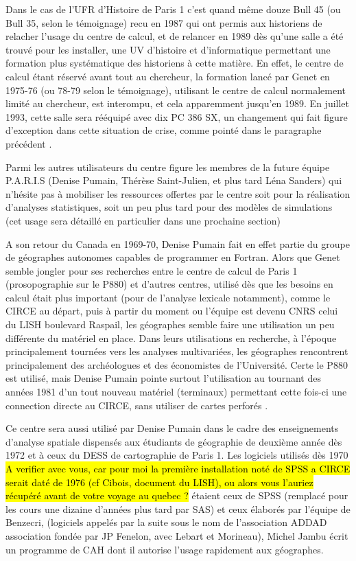 Dans le cas de l'UFR d'Histoire de Paris 1 c'est quand même douze Bull 45 (ou Bull 35, selon le témoignage) recu en 1987 qui ont permis aux historiens de relacher l'usage du centre de calcul, et de relancer en 1989 dès qu'une salle a été trouvé pour les installer, une UV d'histoire et d'informatique permettant une formation plus systématique des historiens à cette matière. En effet, le centre de calcul étant réservé avant tout au chercheur, la formation lancé par Genet en 1975-76 (ou 78-79 selon le témoignage), utilisant le centre de calcul normalement limité au chercheur, est interompu, et cela apparemment jusqu'en 1989. En juillet 1993, cette salle sera rééquipé avec dix PC 386 SX, un changement qui fait figure d'exception dans cette situation de crise, comme pointé dans le paragraphe précédent \autocite{Genet1993}. 

Parmi les autres utilisateurs du centre figure les membres de la future équipe P.A.R.I.S (Denise Pumain, Thérèse Saint-Julien, et plus tard Léna Sanders) qui n'hésite pas à mobiliser les ressources offertes par le centre soit pour la réalisation d'analyses statistiques, soit un peu plus tard pour des modèles de simulations (cet usage sera détaillé en particulier dans une prochaine section)

A son retour du Canada en 1969-70, Denise Pumain fait en effet partie du groupe de géographes autonomes capables de programmer en Fortran. Alors que Genet semble jongler pour ses recherches entre le centre de calcul de Paris 1 (prosopographie sur le P880) et d'autres centres, utilisé dès que les besoins en calcul était plus important (pour de l'analyse lexicale notamment), comme le CIRCE au départ, puis à partir du moment ou l'équipe est devenu CNRS celui du LISH boulevard Raspail, les géographes semble faire une utilisation un peu différente du matériel en place.  Dans leurs utilisations en recherche, à l'époque principalement tournées vers les analyses multivariées, les géographes rencontrent principalement des archéologues et des économistes de l'Université. Certe le P880 est utilisé, mais Denise Pumain pointe surtout l'utilisation au tournant des années 1981 d'un tout nouveau matériel (terminaux) permettant cette fois-ci une connection directe au CIRCE, sans utiliser de cartes perforés .

Ce centre sera aussi utilisé par Denise Pumain dans le cadre des enseignements d'analyse spatiale dispensés aux étudiants de géographie de deuxième année dès 1972 et à ceux du DESS de cartographie de Paris 1. Les logiciels utilisés dès 1970 \hl{A verifier avec vous, car pour moi la première installation noté de SPSS a CIRCE serait daté de 1976 (cf Cibois, document du LISH), ou alors vous l'auriez récupéré avant de votre voyage au quebec ?} étaient ceux de SPSS (remplacé pour les cours une dizaine d'années plus tard par SAS) et ceux élaborés par l'équipe de Benzecri, (logiciels appelés par la suite sous le nom de l'association ADDAD association fondée par JP Fenelon, avec Lebart et Morineau), Michel Jambu écrit un programme de CAH dont il autorise l'usage rapidement aux géographes.

